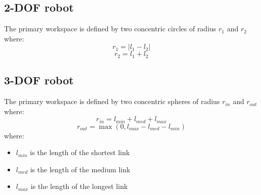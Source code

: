 \documentclass[11pt]{article}
\begin{document}
\subsection{2-DOF robot}
The primary workspace is defined by two concentric circles of radius $r_1$ and $r_2$ where:
\begin{equation}
r_1 = |l_1 - l_2|
\end{equation}
\begin{equation}
r_2 = l_1 + l_2
\end{equation}
\subsection{3-DOF robot}
The primary workspace is defined by two concentric spheres of radius $r_{in}$ and $r_{out}$ where:
\begin{equation}
r_{in}= l_{min}+l_{med}+l_{max}
\end{equation}
\begin{equation}
r_{out} = \max(0,l_{max}- l_{med} -l_{min})
\end{equation}
where:
\begin{itemize}
\item $l_{min}$ is the length of the shortest link
\item $l_{med}$ is the length of the medium link
\item $l_{max}$ is the length of the longest link
\end{itemize}
\end{document}
